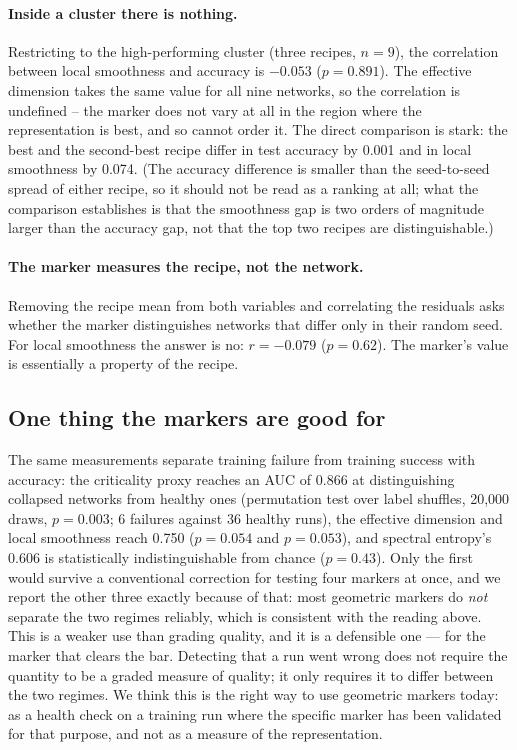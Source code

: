 \documentclass[10pt]{article}
\begin{document}
\paragraph{Inside a cluster there is nothing.}
Restricting to the high-performing cluster (three recipes, $n=9$), the
correlation between local smoothness and accuracy is $-0.053$ ($p=0.891$). The
effective dimension takes the same value for all nine networks, so the
correlation is undefined -- the marker does not vary at all in the region where
the representation is best, and so cannot order it. The direct comparison is
stark: the best and the second-best recipe differ in test accuracy by 0.001
and in local smoothness by 0.074. (The accuracy difference is smaller than the
seed-to-seed spread of either recipe, so it should not be read as a ranking at
all; what the comparison establishes is that the smoothness gap is two orders
of magnitude larger than the accuracy gap, not that the top two recipes are
distinguishable.)

\paragraph{The marker measures the recipe, not the network.}
Removing the recipe mean from both variables and correlating the residuals
asks whether the marker distinguishes networks that differ only in their random
seed. For local smoothness the answer is no: $r=-0.079$ ($p=0.62$). The marker's
value is essentially a property of the recipe.

\subsection{One thing the markers are good for}

The same measurements separate training failure from training success with
accuracy: the criticality proxy reaches an AUC of 0.866 at distinguishing
collapsed networks from healthy ones (permutation test over label shuffles,
20{,}000 draws, $p=0.003$; 6 failures against 36 healthy runs), the effective
dimension and local smoothness reach 0.750 ($p=0.054$ and $p=0.053$), and
spectral entropy's 0.606 is statistically indistinguishable from chance
($p=0.43$). Only the first would survive a conventional correction for
testing four markers at once, and we report the other three exactly because
of that: most geometric markers do \emph{not} separate the two regimes
reliably, which is consistent with the reading above. This is a weaker use
than grading quality, and it is a defensible one --- for the marker that
clears the bar. Detecting that a run went wrong
does not require the quantity to be a graded measure of quality; it only
requires it to differ between the two regimes. We think this is the right way
to use geometric markers today: as a health check on a training run where the
specific marker has been validated for that purpose, and not as a measure of
the representation.
\end{document}
